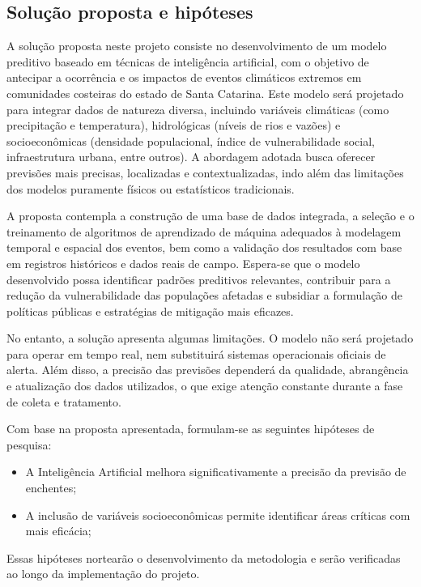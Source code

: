 \subsection{Solução proposta e hipóteses}
\label{sec:solucao-hipoteses}

A solução proposta neste projeto consiste no desenvolvimento de um modelo preditivo baseado em técnicas de inteligência artificial, com o objetivo de antecipar a ocorrência e os impactos de eventos climáticos extremos em comunidades costeiras do estado de Santa Catarina. Este modelo será projetado para integrar dados de natureza diversa, incluindo variáveis climáticas (como precipitação e temperatura), hidrológicas (níveis de rios e vazões) e socioeconômicas (densidade populacional, índice de vulnerabilidade social, infraestrutura urbana, entre outros). A abordagem adotada busca oferecer previsões mais precisas, localizadas e contextualizadas, indo além das limitações dos modelos puramente físicos ou estatísticos tradicionais.

A proposta contempla a construção de uma base de dados integrada, a seleção e o treinamento de algoritmos de aprendizado de máquina adequados à modelagem temporal e espacial dos eventos, bem como a validação dos resultados com base em registros históricos e dados reais de campo. Espera-se que o modelo desenvolvido possa identificar padrões preditivos relevantes, contribuir para a redução da vulnerabilidade das populações afetadas e subsidiar a formulação de políticas públicas e estratégias de mitigação mais eficazes.

No entanto, a solução apresenta algumas limitações. O modelo não será projetado para operar em tempo real, nem substituirá sistemas operacionais oficiais de alerta. Além disso, a precisão das previsões dependerá da qualidade, abrangência e atualização dos dados utilizados, o que exige atenção constante durante a fase de coleta e tratamento.

Com base na proposta apresentada, formulam-se as seguintes hipóteses de pesquisa:

\begin{itemize}
  \item A Inteligência Artificial melhora significativamente a precisão da previsão de enchentes;
  \item A inclusão de variáveis socioeconômicas permite identificar áreas críticas com mais eficácia;
\end{itemize}

Essas hipóteses nortearão o desenvolvimento da metodologia e serão verificadas ao longo da implementação do projeto.

